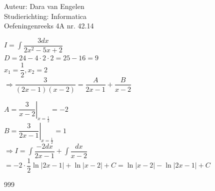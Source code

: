 \documentclass[a4paper]{article}
\begin{document}
  
\noindent \large Auteur: Dara van Engelen \\
\noindent \large Studierichting: Informatica\\
\noindent \large Oefeningenreeks 4A nr. 42.14\\

\medskip

\normalsize

$ I = \displaystyle\int \dfrac{3dx}{2x^2-5x+2}$\\

$D = 24 - 4\cdot2\cdot2 = 25 -16 = 9$\\

$x_1 = \dfrac{1}{2},x_2 = 2$\\

$\Rightarrow \dfrac{3}{(2x-1)(x-2)} = \dfrac{A}{2x-1} + \dfrac{B}{x-2}$

$A  =\left. \dfrac{3}{x-2} \right|_{x=\tfrac{1}{2}} = -2$\\

$B  =\left. \dfrac{3}{2x-1} \right|_{x=\tfrac{1}{2}}= 1$\\

$\Rightarrow I = \displaystyle\int \dfrac{-2dx}{2x-1} + \displaystyle\int \dfrac{dx}{x-2}$\\

$ = -2 \cdot \dfrac{1}{2} \ln|2x-1| + \ln|x-2| + C = \ln|x-2| - \ln|2x-1| + C$

\begin{thebibliography}{999}
\end{thebibliography}
\end{document}
